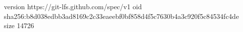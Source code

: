 version https://git-lfs.github.com/spec/v1
oid sha256:b8d038edbb3ad8169c2c33eaeebf0bf858d4f5c7630b4a3c920f5c84534fc4de
size 14726
